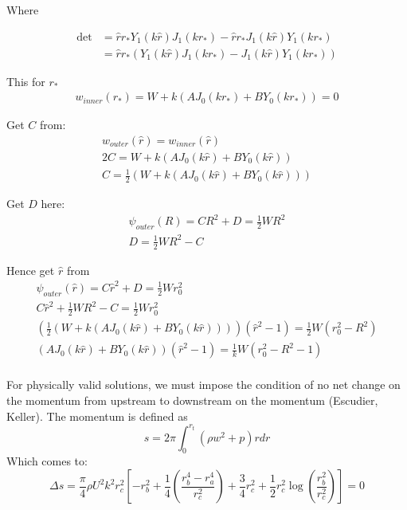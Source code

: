 \documentclass{X:/Documents/Coding/Latex/myreport}
\begin{document}
Where

\begin{align*}
\det &= \hat{r}r_* Y_1(k\hat{r})J_1(kr_*) - \hat{r}r_* J_1(k\hat{r}) Y_1(kr_*)\\
&= \hat{r}r_*\left(Y_1(k\hat{r})J_1(kr_*) -  J_1(k\hat{r}) Y_1(kr_*)\right)
\end{align*}

This for $r_*$
\begin{align*}
    w_{inner}(r_*) = W + k(AJ_0(kr_*) + BY_0(kr_*)) =0
\end{align*}

Get $C$ from:
\begin{align*}
    w_{outer}(\hat{r}) = w_{inner}(\hat{r})\\
    2C = W + k(AJ_0(k\hat{r}) + BY_0(k\hat{r}))\\
    C = \frac12\left(W + k(AJ_0(k\hat{r}) + BY_0(k\hat{r}))\right)
\end{align*}

Get $D$ here:
\begin{align*}
    \psi_{outer}(R) = CR^2 + D = \frac12 WR^2\\
    D = \frac12 WR^2 - C
\end{align*}

Hence get $\hat{r}$ from 
\begin{align*}
    \psi_{outer}(\hat{r}) = C\hat{r}^2 + D = \frac12 Wr_0^2\\
    C\hat{r}^2 + \frac12 WR^2 -C = \frac12 Wr_0^2\\
    \left(\frac12\left(W + k(AJ_0(k\hat{r}) + BY_0(k\hat{r}))\right)\right) (\hat{r}^2 - 1) = \frac12W(r_0^2 - R^2)\\
    \left(AJ_0(k\hat{r}) + BY_0(k\hat{r})\right)(\hat{r}^2 - 1) =\frac1{k}W(r_0^2 - R^2 -1)\\
\end{align*}




For physically valid solutions, we must impose the condition of no net change on the momentum from upstream to downstream  on the momentum (Escudier, Keller). The momentum is defined as
\[s = 2\pi \int_0^{r_t} \left(\rho w^2 + p\right) rdr\]
Which comes to:
\[\Delta s = \frac{\pi}{4} \rho U^2 k^2 r_c^2 \left[-r_b^2 + \frac14 \left(\frac{r_b^4 - r_a^4}{r_c^2}\right) + \frac34 r_c^2 + \frac12 r_c^2 \log \left(\frac{r_b^2}{r_c^2}\right)\right] = 0\]
\end{document}
